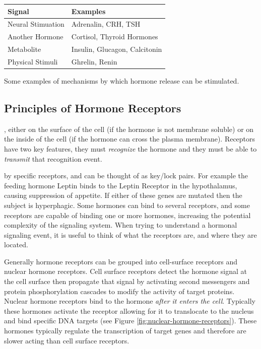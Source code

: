 \documentclass{tufte-handout}
\begin{document}
\begin{margintable}[-1cm]
  \centering
  \begin{tabular}{ll}
    \toprule
    Signal & Examples \\
    \midrule
    Neural Stimuation & Adrenalin, CRH, TSH \\
    Another Hormone & Cortisol, Thyroid Hormones \\
    Metabolite & Insulin, Glucagon, Calcitonin \\
    Physical Stimuli & Ghrelin, Renin \\
    \bottomrule
  \end{tabular}
  \caption{Some examples of mechanisms by which hormone release can be stimulated.}
  \label{tab:secreting-events}
\end{margintable}

\subsection{Principles of Hormone Receptors}

, either on the surface of the cell (if the hormone is not membrane soluble) or on the inside of the cell (if the hormone can cross the plasma membrane).  Receptors have two key features, they must \emph{recognize} the hormone and they must be able to \emph{transmit} that recognition event.

 by specific receptors, and can be thought of as key/lock pairs.  For example the feeding hormone Leptin binds to the Leptin Receptor in the hypothalamus, causing suppression of appetite.  If either of these genes are mutated then the subject is hyperphagic.  Some hormones can bind to several receptors, and some receptors are capable of binding one or more hormones, increasing the potential complexity of the signaling system.  When trying to understand a hormonal signaling event, it is useful to think of what the receptors are, and where they are located.  

Generally hormone receptors can be grouped into cell-surface receptors and nuclear hormone receptors.  Cell surface receptors detect the hormone signal at the cell surface then propagate that signal by activating second messengers and protein phosphorylation cascades to modify the activity of target proteins.  Nuclear hormone receptors bind to the hormone \emph{after it enters the cell}.  Typically these hormones activate the receptor allowing for it to translocate to the nucleus and bind specific DNA targets (see Figure \ref{fig:nuclear-hormone-receptors}).  These hormones typically regulate the transcription of target genes and therefore are slower acting than cell surface receptors.
\end{document}
